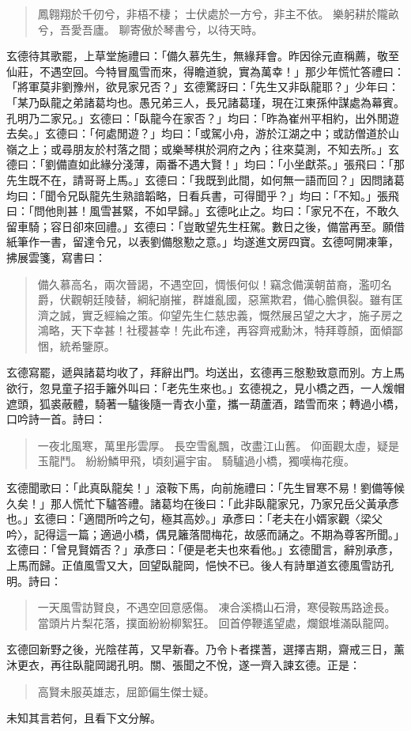 \begin{quote}
鳳翱翔於千仞兮，非梧不棲；
士伏處於一方兮，非主不依。
樂躬耕於隴畝兮，吾愛吾廬。
聊寄傲於琴書兮，以待天時。
\end{quote}

玄德待其歌罷，上草堂施禮曰：「備久慕先生，無緣拜會。昨因徐元直稱薦，敬至仙莊，不遇空回。今特冒風雪而來，得瞻道貌，實為萬幸！」那少年慌忙答禮曰：「將軍莫非劉豫州，欲見家兄否？」玄德驚訝曰：「先生又非臥龍耶？」少年曰：「某乃臥龍之弟諸葛均也。愚兄弟三人，長兄諸葛瑾，現在江東孫仲謀處為幕賓。孔明乃二家兄。」玄德曰：「臥龍今在家否？」均曰：「昨為崔州平相約，出外閒遊去矣。」玄德曰：「何處閒遊？」均曰：「或駕小舟，游於江湖之中；或訪僧道於山嶺之上；或尋朋友於村落之間；或樂琴棋於洞府之內；往來莫測，不知去所。」玄德曰：「劉備直如此緣分淺薄，兩番不遇大賢！」均曰：「小坐獻茶。」張飛曰：「那先生既不在，請哥哥上馬。」玄德曰：「我既到此間，如何無一語而回？」因問諸葛均曰：「聞令兄臥龍先生熟諳韜略，日看兵書，可得聞乎？」均曰：「不知。」張飛曰：「問他則甚！風雪甚緊，不如早歸。」玄德叱止之。均曰：「家兄不在，不敢久留車騎；容日卻來回禮。」玄德曰：「豈敢望先生枉駕。數日之後，備當再至。願借紙筆作一書，留達令兄，以表劉備慇懃之意。」均遂進文房四寶。玄德呵開凍筆，拂展雲箋，寫書曰：

\begin{quote}
備久慕高名，兩次晉謁，不遇空回，惆悵何似！竊念備漢朝苗裔，濫叨名爵，伏觀朝廷陵替，綱紀崩摧，群雄亂國，惡黨欺君，備心膽俱裂。雖有匡濟之誠，實乏經綸之策。仰望先生仁慈忠義，慨然展呂望之大才，施子房之鴻略，天下幸甚！社稷甚幸！先此布達，再容齊戒勳沐，特拜尊顏，面傾鄙悃，統希鑒原。
\end{quote}

玄德寫罷，遞與諸葛均收了，拜辭出門。均送出，玄德再三慇懃致意而別。方上馬欲行，忽見童子招手籬外叫曰：「老先生來也。」玄德視之，見小橋之西，一人煖帽遮頭，狐裘蔽體，騎著一驢後隨一青衣小童，攜一葫蘆酒，踏雪而來；轉過小橋，口吟詩一首。詩曰：

\begin{quote}
一夜北風寒，萬里彤雲厚。
長空雪亂飄，改盡江山舊。
仰面觀太虛，疑是玉龍鬥。
紛紛鱗甲飛，頃刻遍宇宙。
騎驢過小橋，獨嘆梅花瘦。
\end{quote}

玄德聞歌曰：「此真臥龍矣！」滾鞍下馬，向前施禮曰：「先生冒寒不易！劉備等候久矣！」那人慌忙下驢答禮。諸葛均在後曰：「此非臥龍家兄，乃家兄岳父黃承彥也。」玄德曰：「適間所吟之句，極其高妙。」承彥曰：「老夫在小婿家觀〈梁父吟〉，記得這一篇；適過小橋，偶見籬落間梅花，故感而誦之。不期為尊客所聞。」玄德曰：「曾見賢婿否？」承彥曰：「便是老夫也來看他。」玄德聞言，辭別承彥，上馬而歸。正值風雪又大，回望臥龍岡，悒怏不已。後人有詩單道玄德風雪訪孔明。詩曰：

\begin{quote}
一天風雪訪賢良，不遇空回意感傷。
凍合溪橋山石滑，寒侵鞍馬路途長。
當頭片片梨花落，撲面紛紛柳絮狂。
回首停鞭遙望處，爛銀堆滿臥龍岡。
\end{quote}

玄德回新野之後，光陰荏苒，又早新春。乃令卜者揲蓍，選擇吉期，齋戒三日，薰沐更衣，再往臥龍岡謁孔明。關、張聞之不悅，遂一齊入諫玄德。正是：

\begin{quote}
高賢未服英雄志，屈節偏生傑士疑。
\end{quote}

未知其言若何，且看下文分解。
